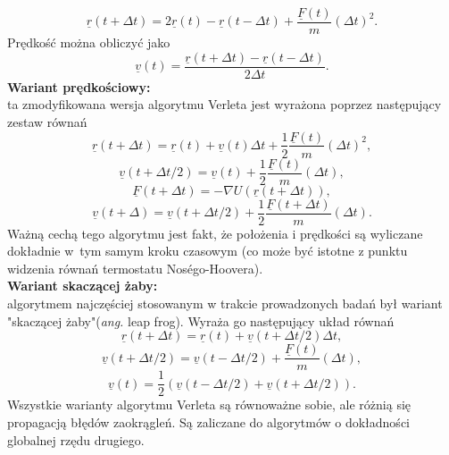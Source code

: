 \documentclass[12pt,a4paper,openright]{report} %
\begin{document}
\begin{equation}
\underline{r}(t+\Delta t)= 2 \underline{r}(t) - \underline{r}(t-\Delta t) + \frac{\underline{F}(t)}{m}(\Delta t)^2.
\end{equation}
Prędkość można obliczyć jako
\begin{equation}
\underline{v}(t)=\frac{\underline{r}(t+\Delta t)-\underline{r}(t-\Delta t)}{2 \Delta t}.
\end{equation}
\textbf{Wariant prędkościowy:} \\
ta zmodyfikowana wersja algorytmu Verleta jest wyrażona poprzez następujący zestaw równań
\begin{equation}
\underline{r}(t+\Delta t)=\underline{r}(t)+\underline{v}(t)\Delta t + \frac{1}{2} \frac{\underline{F}(t)}{m}(\Delta t)^2,
\end{equation}
\begin{equation}
\underline{v}(t+\Delta t/2)=\underline{v}(t) + \frac{1}{2} \frac{\underline{F}(t)}{m}(\Delta t),
\end{equation}
\begin{equation}
\underline{F}(t+\Delta t)=-\nabla U (\underline{r}(t+\Delta t)),
\end{equation}
\begin{equation}
\underline{v}(t+\Delta)=\underline{v}(t+\Delta t/2) + \frac{1}{2} \frac{\underline{F}(t+\Delta t)}{m}(\Delta t).
\end{equation}
Ważną cechą tego algorytmu jest fakt, że położenia i prędkości są wyliczane dokładnie w~tym samym kroku czasowym (co może być istotne z punktu widzenia równań termostatu Nos\'{e}go-Hoovera).
\\
\textbf{Wariant skaczącej żaby:}\\
algorytmem najczęściej stosowanym w trakcie prowadzonych badań był wariant "skaczącej żaby"(\textit{ang.} leap frog). Wyraża go następujący układ równań
\begin{equation}
\underline{r}(t+\Delta t) = \underline{r} (t) + \underline{v}(t+\Delta t/2)\Delta t,
\end{equation}
\begin{equation}
\underline{v}(t+\Delta t/2)=\underline{v}(t-\Delta t/2)+\frac{\underline{F}(t)}{m}(\Delta t),
\end{equation}
\begin{equation}
\underline{v}(t)=\frac{1}{2} \left( \underline{v}(t-\Delta t/2) + \underline{v}(t+\Delta t/2) \right).
\end{equation}
Wszystkie warianty algorytmu Verleta są równoważne sobie, ale różnią się propagacją błędów zaokrągleń. Są zaliczane do algorytmów o dokładności globalnej rzędu drugiego.
\end{document}
